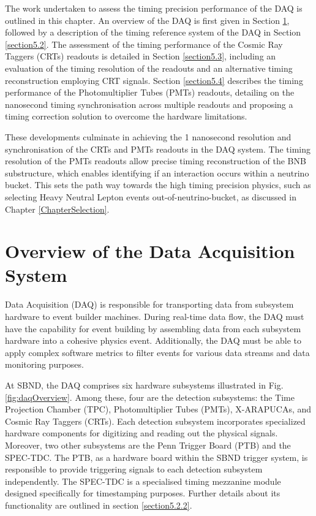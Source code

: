 The work undertaken to assess the timing precision performance of the DAQ is outlined in this chapter.
An overview of the DAQ is first given in Section \ref{section5.1}, followed by a description of the timing reference system of the DAQ in Section \ref{section5.2}. 
The assessment of the timing performance of the Cosmic Ray Taggers (CRTs) readouts is detailed in Section \ref{section5.3}, including an evaluation of the timing resolution of the readouts and an alternative timing reconstruction employing CRT signals. 
Section \ref{section5.4} describes the timing performance of the Photomultiplier Tubes (PMTs) readouts, detailing on the nanosecond timing synchronisation across multiple readouts and proposing a timing correction solution to overcome the hardware limitations. 

These developments culminate in achieving the 1 nanosecond resolution and synchronisation of the CRTs and PMTs readouts in the DAQ system. 
The timing resolution of the PMTs readouts allow precise timing reconstruction of the BNB substructure, which enables identifying if an interaction occurs within a neutrino bucket. 
This sets the path way towards the high timing precision physics, such as selecting Heavy Neutral Lepton events out-of-neutrino-bucket, as discussed in Chapter \ref{ChapterSelection}. 

\newpage
\section{Overview of the Data Acquisition System}
\label{section5.1}

Data Acquisition (DAQ) is responsible for transporting data from subsystem hardware to event builder machines.
During real-time data flow, the DAQ must have the capability for event building by assembling data from each subsystem hardware into a cohesive physics event. 
Additionally, the DAQ must be able to apply complex software metrics to filter events for various data streams and data monitoring purposes.

At SBND, the DAQ comprises six hardware subsystems illustrated in Fig. \ref{fig:daqOverview}.
Among these, four are the detection subsystems: the Time Projection Chamber (TPC), Photomultiplier Tubes (PMTs), X-ARAPUCAs, and Cosmic Ray Taggers (CRTs).
Each detection subsystem incorporates specialized hardware components for digitizing and reading out the physical signals. 
Moreover, two other subsystems are the Penn Trigger Board (PTB) \cite{ptb_gvs} and the SPEC-TDC. 
The PTB, as a hardware board within the SBND trigger system, is responsible to provide triggering signals to each detection subsystem independently.
The SPEC-TDC is a specialised timing mezzanine module designed specifically for timestamping purposes.
Further details about its functionality are outlined in section \ref{section5.2.2}.

